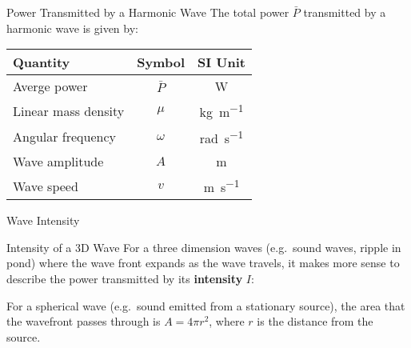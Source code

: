 \documentclass[12pt,aspectratio=169]{beamer}
\newcommand{\eq}[2]{\vspace{#1}{\Large\begin{displaymath}#2\end{displaymath}}}
\begin{document}



\begin{frame}{Power Transmitted by a Harmonic Wave}
  The total power $\bar{P}$ transmitted by a harmonic wave is given by:

  \eq{-.2in}{
    \boxed{\bar{P}=\frac{1}{2}\mu\omega^2A^2v}
  }
  \begin{center}
    \begin{tabular}{l|c|c}
      \rowcolor{pink}
      \textbf{Quantity} & \textbf{Symbol} & \textbf{SI Unit} \\ \hline
      Averge power        & $\bar{P}$ & \si{\watt} \\
      Linear mass density & $\mu$     & \si{\kilo\gram\per\metre}\\
      Angular frequency   & $\omega$  & \si{rad\per\second}\\
      Wave amplitude      & $A$       & \si{\metre} \\
      Wave speed          & $v$       & \si{\metre\per\second}
    \end{tabular}
  \end{center}  
\end{frame}


\begin{frame}{Wave Intensity}


\end{frame}



\begin{frame}{Intensity of a 3D Wave}
  For a three dimension waves (e.g.\ sound waves, ripple in pond) where the
  wave front expands as the wave travels, it makes more sense to describe the
  power transmitted by its \textbf{intensity} $I$:

  \eq{-.25in}{
    \boxed{I=\frac{\bar{P}}{A}} %
  }

  For a spherical wave (e.g.\ sound emitted from a stationary source), the
  area that the wavefront passes through is $A=4\pi r^2$, where $r$ is the
  distance from the source.
\end{frame}
\end{document}
